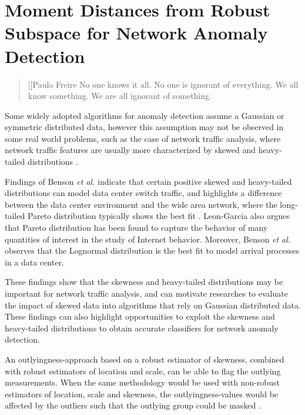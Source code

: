 \chapter{Moment Distances from Robust Subspace for Network Anomaly Detection}
\label{ch:4_m_rpca}

\begin{quotation}[]{Paulo Freire}
No one knows it all. No one is ignorant of everything. We all know something. We are all ignorant of something.
\end{quotation}

Some widely adopted algorithms for anomaly detection assume a Gaussian or symmetric distributed data, however this assumption may not be observed in some real world problems, such as the case of network traffic analysis, where network traffic features are usually more characterized by skewed and heavy-tailed distributions \cite{lakhina2005mining,benson2010network, leon2017probability}.

Findings of Benson \emph{et al.}  \cite{benson2010network} indicate that certain positive skewed and heavy-tailed distributions can model data center switch traffic, and highlights a difference between the data center environment and the wide area network, where the long-tailed Pareto distribution typically shows the best fit \cite{benson2010network}. Leon-Garcia \cite{leon2017probability} also argues that Pareto distribution has been found to capture the behavior of many quantities of interest in the study of Internet behavior. Moreover, Benson \emph{et al.}  \cite{benson2010network} observes that the Lognormal distribution is the best fit to model arrival processes in a data center.

These findings show that the skewness and heavy-tailed distributions may be important for network traffic analysis, and can motivate researches to evaluate the impact of skewed data into algorithms that rely on Gaussian distributed data. These findings can also highlight opportunities to  exploit the skewness and heavy-tailed distributions to obtain accurate classifiers for network anomaly detection.

An outlyingness-approach based on a robust estimator of skewness, combined with robust estimators of location and scale, can be able to flag the outlying measurements. When the same methodology would be used with non-robust estimators of location, scale and skewness, the outlyingness-values would be affected by the outliers such that the outlying group could be masked \cite{hubert2009robustskewed}.

